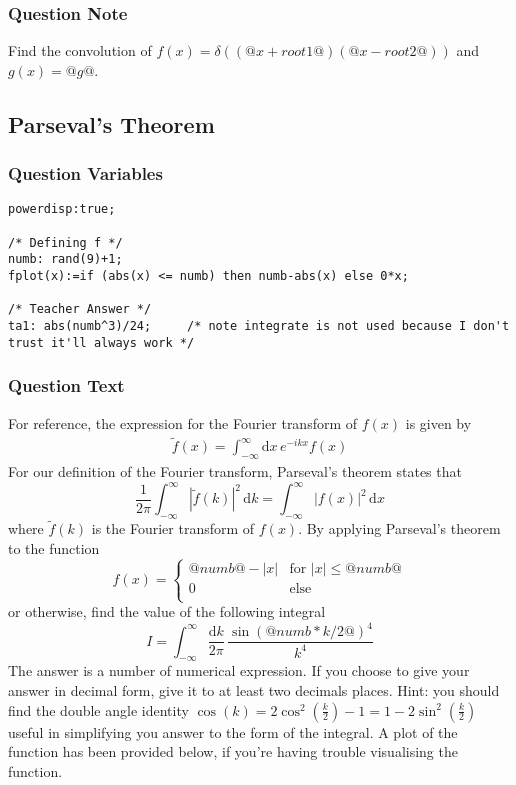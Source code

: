 \documentclass[a4paper,10pt]{article}
\begin{document}
\subsubsection{Question Note}
Find the convolution of \(f(x)= \delta((@x+root1@)(@x-root2@))\) and \( g(x) = @g@ \).

\subsection{Parseval's Theorem}
\subsubsection{Question Variables}
\begin{lstlisting}
powerdisp:true;

/* Defining f */
numb: rand(9)+1;
fplot(x):=if (abs(x) <= numb) then numb-abs(x) else 0*x;

/* Teacher Answer */
ta1: abs(numb^3)/24;     /* note integrate is not used because I don't trust it'll always work */
\end{lstlisting}
\subsubsection{Question Text}
For reference, the expression for the Fourier transform of $f(x)$ is given by \begin{align*}
\tilde{f}(x) = \int_{-\infty}^{\infty} \text{d}x \, e^{-ikx}f(x)
\end{align*}
For our definition of the Fourier transform, Parseval's theorem states that \[ \frac{1}{2\pi}\int_{-\infty}^{\infty} |\tilde{f}(k)|^2 \, \text{d}k = \int_{-\infty}^{\infty} |f(x)|^2 \, \text{d}x \]where $\tilde{f}(k)$ is the Fourier transform of $f(x)$. By applying Parseval's theorem to the function \[ f(x) = \begin{cases} @numb@-|x| & \text{for } |x| \leq @numb@\\ 0 & \text{else} \\ \end{cases} \] or otherwise, find the value of the following integral \[ I = \int_{-\infty}^{\infty}\frac{\text{d}k}{2\pi} \, \frac{\sin(@numb*k/2@)^4}{k^4} \] The answer is a number of numerical expression. If you choose to give your answer in decimal form, give it to at least two decimals places. Hint: you should find the double angle identity \(\cos(k) = 2\cos^2(\frac{k}{2}) -1 = 1 - 2\sin^2(\frac{k}{2})\) useful in simplifying you answer to the form of the integral. A plot of the function has been provided below, if you're having trouble visualising the function.
\end{document}
